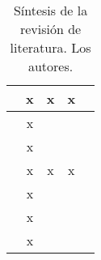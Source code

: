 \begin{table}[h]
\begin{tabular}{|l|l|l|l|l|}
		\cite{DeBaun2005}                                   & \multicolumn{1}{c|}{x}                                         & \multicolumn{1}{c|}{x}                                               & \multicolumn{1}{c|}{x}                                              & \multicolumn{1}{c|}{}                                               \\ \hline
		\cite{Mohammad2017}                                  & \multicolumn{1}{c|}{x}                                         & \multicolumn{1}{c|}{}                                               & \multicolumn{1}{c|}{}                                              & \multicolumn{1}{c|}{}                                               \\ \hline
		\cite{WANG201519}                                   & \multicolumn{1}{c|}{x}                                         & \multicolumn{1}{c|}{}                                               & \multicolumn{1}{c|}{}                                              & \multicolumn{1}{c|}{}                                               \\ \hline
		\cite{ZHANG2007135}                                   & \multicolumn{1}{c|}{x}                                         & \multicolumn{1}{c|}{x}                                               & \multicolumn{1}{c|}{x}                                              & \multicolumn{1}{c|}{}                                               \\ \hline
		\cite{Wang2016Pol}                                   & \multicolumn{1}{c|}{x}                                         & \multicolumn{1}{c|}{}                                               & \multicolumn{1}{c|}{}                                              & \multicolumn{1}{c|}{}                                               \\ \hline
		\cite{Hu2013}                                   & \multicolumn{1}{c|}{x}                                         & \multicolumn{1}{c|}{}                                               & \multicolumn{1}{c|}{}                                              & \multicolumn{1}{c|}{}                                               \\ \hline
		\cite{ZAYDULLIN201451}                                   & \multicolumn{1}{c|}{x}                                         & \multicolumn{1}{c|}{}                                               & \multicolumn{1}{c|}{}                                              & \multicolumn{1}{c|}{}                                               \\ \hline
		
	\end{tabular}
\caption[Síntesis de la revisión de literatura.]{Síntesis de la revisión de literatura. Los autores.}
\label{tab:LitReview}
\end{table}



